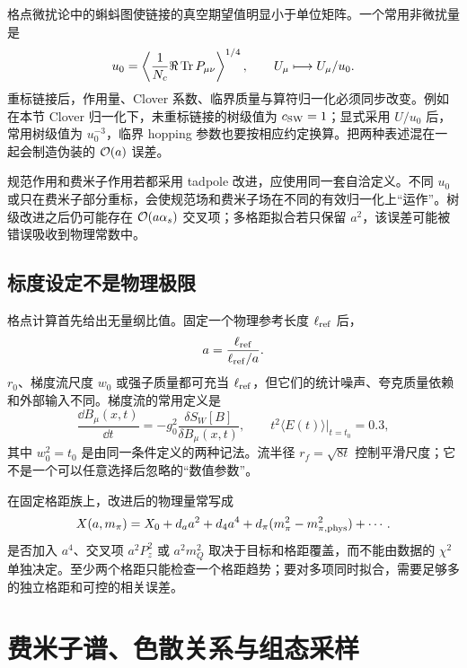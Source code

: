 格点微扰论中的蝌蚪图使链接的真空期望值明显小于单位矩阵。一个常用非微扰量是
\begin{equation}
  u_0=\left\langle\frac1{N_c}\Re\operatorname{Tr} P_{\mu\nu}\right\rangle^{1/4},
  \qquad U_\mu\longmapsto U_\mu/u_0 .
  \label{eq:tadpole}
\end{equation}
重标链接后，作用量、Clover 系数、临界质量与算符归一化必须同步改变。例如在本节 Clover 归一化下，未重标链接的树级值为 \(c_{\rm SW}=1\)；显式采用 \(U/u_0\) 后，常用树级值为 \(u_0^{-3}\)，临界 hopping 参数也要按相应约定换算。把两种表述混在一起会制造伪装的 \(\mathcal{O}(a)\) 误差。

规范作用和费米子作用若都采用 tadpole 改进，应使用同一套自洽定义。不同 \(u_0\) 或只在费米子部分重标，会使规范场和费米子场在不同的有效归一化上“运作”。树级改进之后仍可能存在 \(\mathcal{O}(a\alpha_s)\) 交叉项；多格距拟合若只保留 \(a^2\)，该误差可能被错误吸收到物理常数中。

\section{标度设定不是物理极限}

格点计算首先给出无量纲比值。固定一个物理参考长度 \(\ell_{\rm ref}\) 后，
\begin{equation}
  a=\frac{\ell_{\rm ref}}{\ell_{\rm ref}/a}.
  \label{eq:b01-scale-setting}
\end{equation}
\(r_0\)、梯度流尺度 \(w_0\) 或强子质量都可充当 \(\ell_{\rm ref}\)，但它们的统计噪声、夸克质量依赖和外部输入不同。梯度流的常用定义是
\begin{equation}
  \frac{\dd B_\mu(x,t)}{\dd t}
  =-g_0^2\frac{\delta S_W[B]}{\delta B_\mu(x,t)},
  \qquad
  t^2\langle E(t)\rangle\big|_{t=t_0}=0.3,
  \label{eq:flow-scale}
\end{equation}
其中 \(w_0^2=t_0\) 是由同一条件定义的两种记法。流半径 \(r_f=\sqrt{8t}\) 控制平滑尺度；它不是一个可以任意选择后忽略的“数值参数”。

在固定格距族上，改进后的物理量常写成
\begin{equation}
  X(a,m_\pi)=X_0+d_a a^2+d_4a^4
  +d_\pi(m_\pi^2-m_{\pi,\rm phys}^2)+\cdots .
  \label{eq:continuum-fit}
\end{equation}
是否加入 \(a^4\)、交叉项 \(a^2P_z^2\) 或 \(a^2m_Q^2\) 取决于目标和格距覆盖，而不能由数据的 \(\chi^2\) 单独决定。至少两个格距只能检查一个格距趋势；要对多项同时拟合，需要足够多的独立格距和可控的相关误差。

\chapter{费米子谱、色散关系与组态采样}

